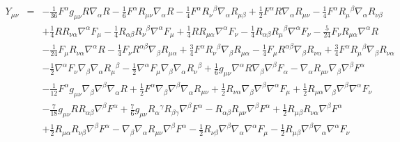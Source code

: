 \documentclass[10pt,letterpaper]{article}
\numberwithin{equation}{section}
\begin{document}
\begin{eqnarray}
\\ \nonumber\\
%
Y_{\mu\nu}&=& - \tfrac{1}{36} F^{\alpha } g_{\mu \nu } R \nabla_{\alpha }R -  \tfrac{1}{6} F^{\alpha } R_{\mu \nu } \nabla_{\alpha }R -  \tfrac{1}{4} F^{\alpha } R_{\nu }{}^{\beta } \nabla_{\alpha }R_{\mu \beta } + \tfrac{1}{2} F^{\alpha } R \nabla_{\alpha }R_{\mu \nu } -  \tfrac{1}{4} F^{\alpha } R_{\mu }{}^{\beta } \nabla_{\alpha }R_{\nu \beta } \nonumber \\ 
&& + \tfrac{1}{4} R R_{\nu \alpha } \nabla^{\alpha }F_{\mu } -  \tfrac{1}{4} R_{\alpha \beta } R_{\nu }{}^{\beta } \nabla^{\alpha }F_{\mu } + \tfrac{1}{4} R R_{\mu \alpha } \nabla^{\alpha }F_{\nu } -  \tfrac{1}{4} R_{\alpha \beta } R_{\mu }{}^{\beta } \nabla^{\alpha }F_{\nu } -  \tfrac{5}{24} F_{\nu } R_{\mu \alpha } \nabla^{\alpha }R \nonumber \\ 
&& -  \tfrac{1}{24} F_{\mu } R_{\nu \alpha } \nabla^{\alpha }R -  \tfrac{1}{4} F_{\nu } R^{\alpha \beta } \nabla_{\beta }R_{\mu \alpha } + \tfrac{3}{4} F^{\alpha } R_{\nu }{}^{\beta } \nabla_{\beta }R_{\mu \alpha } -  \tfrac{1}{4} F_{\mu } R^{\alpha \beta } \nabla_{\beta }R_{\nu \alpha } + \tfrac{3}{4} F^{\alpha } R_{\mu }{}^{\beta } \nabla_{\beta }R_{\nu \alpha } \nonumber \\ 
&& -  \tfrac{1}{2} \nabla^{\alpha }F_{\nu } \nabla_{\beta }\nabla_{\alpha }R_{\mu }{}^{\beta } -  \tfrac{1}{2} \nabla^{\alpha }F_{\mu } \nabla_{\beta }\nabla_{\alpha }R_{\nu }{}^{\beta } + \tfrac{1}{6} g_{\mu \nu } \nabla^{\alpha }R \nabla_{\beta }\nabla^{\beta }F_{\alpha } -  \nabla_{\alpha }R_{\mu \nu } \nabla_{\beta }\nabla^{\beta }F^{\alpha } \nonumber \\ 
&& -  \tfrac{1}{12} F^{\alpha } g_{\mu \nu } \nabla_{\beta }\nabla^{\beta }\nabla_{\alpha }R + \tfrac{1}{2} F^{\alpha } \nabla_{\beta }\nabla^{\beta }\nabla_{\alpha }R_{\mu \nu } + \tfrac{1}{2} R_{\nu \alpha } \nabla_{\beta }\nabla^{\beta }\nabla^{\alpha }F_{\mu } + \tfrac{1}{2} R_{\mu \alpha } \nabla_{\beta }\nabla^{\beta }\nabla^{\alpha }F_{\nu } \nonumber \\ 
&& -  \tfrac{7}{18} g_{\mu \nu } R R_{\alpha \beta } \nabla^{\beta }F^{\alpha } + \tfrac{7}{6} g_{\mu \nu } R_{\alpha }{}^{\gamma } R_{\beta \gamma } \nabla^{\beta }F^{\alpha } -  R_{\alpha \beta } R_{\mu \nu } \nabla^{\beta }F^{\alpha } + \tfrac{1}{2} R_{\mu \beta } R_{\nu \alpha } \nabla^{\beta }F^{\alpha } \nonumber \\ 
&& + \tfrac{1}{2} R_{\mu \alpha } R_{\nu \beta } \nabla^{\beta }F^{\alpha } -  \nabla_{\beta }\nabla_{\alpha }R_{\mu \nu } \nabla^{\beta }F^{\alpha } -  \tfrac{1}{2} R_{\nu \beta } \nabla^{\beta }\nabla_{\alpha }\nabla^{\alpha }F_{\mu } -  \tfrac{1}{2} R_{\mu \beta } \nabla^{\beta }\nabla_{\alpha }\nabla^{\alpha }F_{\nu } \nonumber \\ 

\end{eqnarray}
\end{document}

